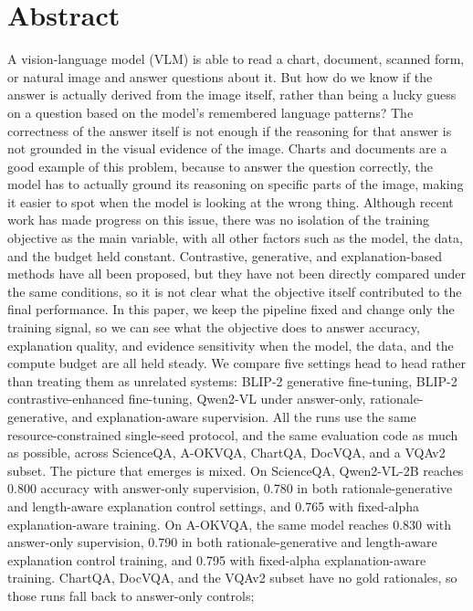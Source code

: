 \documentclass[12pt,bibliography=totoc,listof=totoc,BCOR=5mm,DIV=12,oneside,open=any]{scrbook}
\begin{document}
    \chapter*{Abstract}
A vision-language model (VLM) is able to read a chart, document, scanned form, or natural image and answer questions about it. 
But how do we know if the answer is actually derived from the image itself, rather than being a lucky guess on a question based on the model's remembered language patterns?
The correctness of the answer itself is not enough if the reasoning for that answer is not grounded in the visual evidence of the image.
Charts and documents are a good example of this problem, because to answer the question correctly, the model has to actually ground its reasoning on specific parts of the image,
making it easier to spot when the model is looking at the wrong thing. Although recent work has made progress on this issue,
there was no isolation of the training objective as the main variable, with all other factors such as the model, the data, and the budget held constant.
Contrastive, generative, and explanation-based methods have all been proposed, but they have not been directly compared under the same conditions,
so it is not clear what the objective itself contributed to the final performance. 
In this paper, we keep the pipeline fixed and change only the training signal, so we can see what the objective does to answer accuracy, explanation quality, 
and evidence sensitivity when the model, the data, and the compute budget are all held steady.
We compare five settings head to head rather than treating them as unrelated systems: BLIP-2 generative fine-tuning, BLIP-2 contrastive-enhanced fine-tuning,
Qwen2-VL under answer-only, rationale-generative, and explanation-aware supervision.
All the runs use the same resource-constrained single-seed protocol, and the same evaluation code as much as possible,
across ScienceQA, A-OKVQA, ChartQA, DocVQA, and a VQAv2 subset.
The picture that emerges is mixed. On ScienceQA, Qwen2-VL-2B reaches 0.800 accuracy with answer-only supervision,
0.780 in both rationale-generative and length-aware explanation control settings, and 0.765 with fixed-alpha explanation-aware training.
On A-OKVQA, the same model reaches 0.830 with answer-only supervision, 0.790 in both rationale-generative and length-aware explanation control training,
and 0.795 with fixed-alpha explanation-aware training.
ChartQA, DocVQA, and the VQAv2 subset have no gold rationales, so those runs fall back to answer-only controls;
\end{document}
